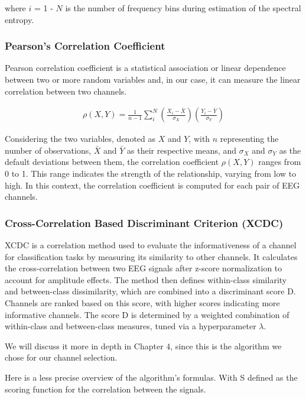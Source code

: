 \documentclass{Configuration_Files/PoliMi3i_thesis}
\begin{document}
where $i$ = 1 - $N$ is the number of frequency bins during estimation of the spectral entropy.

\subsubsection{Pearson’s Correlation Coefficient }

Pearson correlation coefficient is a statistical association or linear dependence between two or more random variables and, in our case, it can measure the linear correlation between two channels. \cite{thibeaultUsingHybridNeuron2013}


\begin{align}
	\rho (X,Y) = \frac{1}{n-1} \sum_{i}^{N}(\frac{X_i - \bar{X}}{\sigma_{X}})( \frac{Y_i - \bar{Y}}{\sigma_{Y}})
	\label{eq:correlationCoefficient}
\end{align}

Considering the two variables, denoted as \( X \) and \( Y \), with \( n \) representing the number of observations, \( \bar{X} \) and \( \bar{Y} \) as their respective means, and \( \sigma_X \) and \( \sigma_Y \) as the default deviations between them, the correlation coefficient \( \rho(X,Y) \) ranges from 0 to 1. This range indicates the strength of the relationship, varying from low to high. In this context, the correlation coefficient is computed for each pair of EEG channels.

\subsubsection{Cross-Correlation Based Discriminant Criterion (XCDC)}
XCDC is a correlation method used to evaluate the informativeness of a channel for classification tasks by measuring its similarity to other channels. It calculates the cross-correlation between two EEG signals after z-score normalization to account for amplitude effects. The method then defines within-class similarity and between-class dissimilarity, which are combined into a discriminant score D. Channels are ranked based on this score, with higher scores indicating more informative channels. The score D is determined by a weighted combination of within-class and between-class measures, tuned via a hyperparameter $\lambda$.

We will discuss it more in depth in Chapter $4$, since this is the algorithm we chose for our channel selection.

Here is a less precise overview of the algorithm's formulas.
With S defined as the scoring function for the correlation between the signals.
\end{document}
